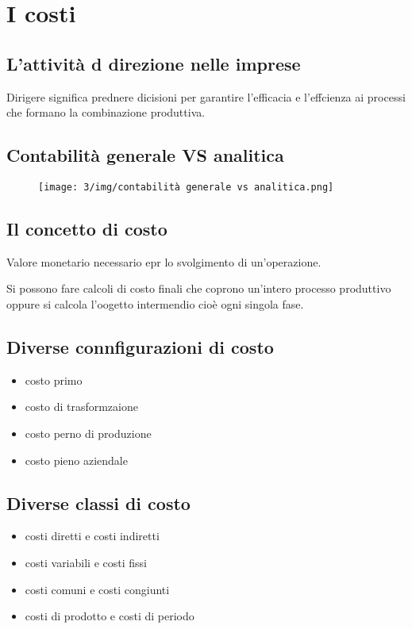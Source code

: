 \section{I costi}

\subsection{L'attività d direzione nelle imprese}

Dirigere significa prednere dicisioni per garantire l'efficacia e l'effcienza ai processi che formano la combinazione produttiva.

\subsection{Contabilità generale VS analitica}

\begin{figure}[H]
    \centering
    \texttt{[image: 3/img/contabilità generale vs analitica.png]}
\end{figure}

\subsection{Il concetto di costo}

Valore monetario necessario epr lo svolgimento di un'operazione.


Si possono fare calcoli di costo finali che coprono un'intero processo produttivo oppure 
si calcola l'oogetto intermendio cioè ogni singola fase.

\subsection{Diverse connfigurazioni di costo}
\begin{itemize}
    \item costo primo
    \item costo di trasformzaione
    \item costo perno di produzione
    \item costo pieno aziendale
\end{itemize}

\subsection{Diverse classi di costo}
\begin{itemize}
    \item costi diretti e costi indiretti
    \item costi variabili e costi fissi
    \item costi comuni e costi congiunti
    \item costi di prodotto e costi di periodo
\end{itemize}

